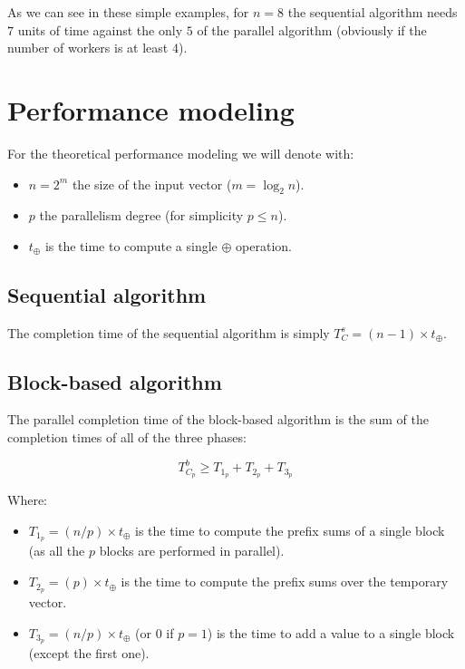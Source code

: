 \documentclass{article}
\begin{document}
As we can see in these simple examples, for $n = 8$ the sequential algorithm needs $7$ units of time against the only $5$ of the parallel algorithm (obviously if the number of workers is at least $4$). 

\section{Performance modeling}

For the theoretical performance modeling we will denote with:

\begin{itemize}
  \item $n = 2^m$ the size of the input vector ($m = \log_2{n}$).
  \item $p$ the parallelism degree (for simplicity $p \leq n$).
  \item $t_{\oplus}$ is the time to compute a single $\oplus$ operation.
\end{itemize} 

\subsection{Sequential algorithm}

The completion time of the sequential algorithm is simply $T^{s}_C = (n-1) \times t_{\oplus}$. 

\subsection{Block-based algorithm}

The parallel completion time of the block-based algorithm is the sum of the completion times of all of the three phases:

\begin{equation}
  T^{b}_{C_p} \geq T_{1_p} + T_{2_p} + T_{3_p}
\end{equation} 

Where:

\begin{itemize}
  \item $T_{1_p} = (n/p) \times t_{\oplus}$ is the time to compute the prefix sums of a single block (as all the $p$ blocks are performed in parallel).
  \item $T_{2_p} = (p) \times t_{\oplus}$ is the time to compute the prefix sums over the temporary vector.
  \item $T_{3_p} = (n/p) \times t_{\oplus}$ (or $0$ if $p = 1$) is the time to add a value to a single block (except the first one).
\end{itemize}
\end{document}
